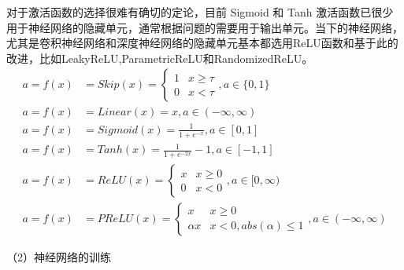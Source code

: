 对于激活函数的选择很难有确切的定论，目前 Sigmoid 和 Tanh 激活函数已很少用于神经网络的隐藏单元，通常根据问题的需要用于输出单元。当下的神经网络，尤其是卷积神经网络和深度神经网络的隐藏单元基本都选用ReLU函数和基于此的改进，比如LeakyReLU,ParametricReLU和RandomizedReLU。
\begin{subequations}
\begin{align}
a = f(x) &= Skip(x) = \left\{\begin{matrix}
1 & x \geqslant \tau  \\ 
0 &  x < \tau  
\end{matrix}\right. , a \in \{0, 1\} \label{equ:gan-act-func-skip} \\
a = f(x) &= Linear(x)=x , a \in (-\infty, \infty) \label{equ:gan-act-func-identity}\\
a = f(x) &= Sigmoid(x) = \frac{1}{1+e^{-x}} \label{equ:gan-act-func-sigmoid}, a \in [0, 1] \\
a = f(x) &= Tanh(x) = \frac{1}{1+e^{-2x}} - 1 \label{equ:gan-act-func-tanh} , a \in [-1, 1] \\
a = f(x) &= ReLU(x) = \left\{\begin{matrix}
x & x \geqslant 0 \\ 
0 &  x < 0
\end{matrix}\right. , a \in [0, \infty) \label{equ:gan-act-func-relu}\\
a = f(x) &= PReLU(x) = \left\{\begin{matrix}
x & x \geqslant 0 \\ 
\alpha x &  x < 0, abs(\alpha) \leq 1
\end{matrix}\right. , a \in (-\infty, \infty) \label{equ:gan-act-func-parametric-relu}
\end{align}
\end{subequations}

（2）神经网络的训练

